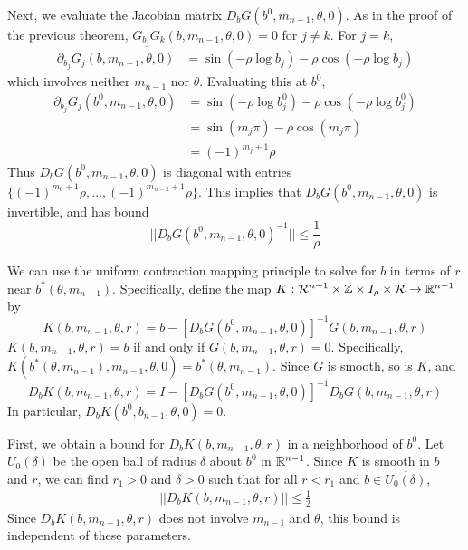 \documentclass[thesis.tex]{subfiles}
\begin{document}
Next, we evaluate the Jacobian matrix $D_b G(b^0, m_{n-1}, \theta, 0)$. As in the proof of the previous theorem, $G_{b_j} G_k(b, m_{n-1}, \theta, 0) = 0$ for $j \neq k$. For $j = k$,
\begin{align*}
\partial_{b_j} G_j(b, m_{n-1}, \theta, 0) &= \sin \left( -\rho \log b_j \right) - \rho \cos \left( -\rho \log b_j \right) 
\end{align*}
which involves neither $m_{n-1}$ nor $\theta$. Evaluating this at $b^0$,
\begin{align*}
\partial_{b_j} G_j(b^0, m_{n-1}, \theta, 0) &= \sin \left( -\rho \log b_j^0 \right) - \rho \cos \left( -\rho \log b_j^0 \right) \\
&= \sin \left( m_j \pi \right) - \rho \cos \left(m_j \pi \right) \\
&= (-1)^{m_j + 1} \rho
\end{align*}
Thus $D_b G(b^0, m_{n-1}, \theta, 0)$ is diagonal with entries $\{ (-1)^{m_0 + 1} \rho, \dots, (-1)^{m_{n-2} + 1} \rho \}$. This implies that $D_b G(b^0, m_{n-1}, \theta, 0)$ is invertible, and has bound
\begin{equation}\label{DbG0invbound}
||D_b G(b^0, m_{n-1}, \theta, 0)^{-1}|| \leq \frac{1}{\rho}
\end{equation}

We can use the uniform contraction mapping principle to solve for $b$ in terms of $r$ near $b^*(\theta, m_{n-1})$. Specifically, define the map $K: \mathcal{R}^{n-1} \times {\mathbb Z} \times I_\rho \times \mathcal{R} \rightarrow {\mathbb R}^{n-1}$ by
\begin{equation}\label{defKb}
K(b, m_{n-1}, \theta, r) = b - [D_b G(b^0, m_{n-1}, \theta, 0)]^{-1} G(b, m_{n-1}, \theta, r)
\end{equation}
$K(b, m_{n-1}, \theta, r) = b$ if and only if $G(b, m_{n-1}, \theta, r) = 0$. Specifically, $K(b^*(\theta, m_{n-1}), m_{n-1}, \theta, 0) = b^*(\theta, m_{n-1})$. Since $G$ is smooth, so is $K$, and 
\begin{equation}\label{DbK}
D_b K(b, m_{n-1}, \theta, r) = I - [D_b G(b^0, m_{n-1}, \theta, 0)]^{-1} D_b G(b, m_{n-1}, \theta, r)
\end{equation}
In particular, $D_b K(b^0, b_{n-1}, \theta, 0) = 0$.

First, we obtain a bound for $D_b K(b, m_{n-1}, \theta, r)$ in a neighborhood of $b^0$. Let $U_0(\delta)$ be the open ball of radius $\delta$ about $b^0$ in ${\mathbb R}^{n-1}$. Since $K$ is smooth in $b$ and $r$, we can find $r_1 > 0$ and $\delta > 0$ such that for all $r < r_1$ and $b \in \overline{ U_0(\delta) }$,  
\begin{align}\label{DbKbound}
|| D_b K(b, m_{n-1}, \theta, r)|| \leq \frac{1}{2}
\end{align}
Since $D_b K(b, m_{n-1}, \theta, r)$ does not involve $m_{n-1}$ and $\theta$, this bound is independent of these parameters.
\end{document}
